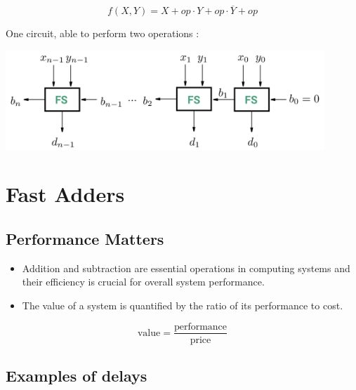 \documentclass[12pt,openany, tikz,border=10pt]{book}
\begin{document}
  \[
  f(X, Y) = X + op \cdot Y + op \cdot \overline{Y} + op
  \]

  \vspace*{10px}

  One circuit, able to perform two operations :
  \begin{center}
    \begin{minipage}[c]{0.90\textwidth} %
        \centering
        \includegraphics[width=0.90\textwidth]{circuits/8.2.5.png} %
    \end{minipage}
    \end{center}

\section{Fast Adders}
\subsection{Performance Matters}
\begin{itemize}
  \item[] Addition and subtraction are essential operations in computing systems and their efficiency is crucial for overall system performance.
  \item[] The value of a system is quantified by the ratio of its performance to cost.
\end{itemize}
\[
\text{value} = \frac{\text{performance}}{\text{price}}
\]
\subsection{Examples of delays}
\end{document}
